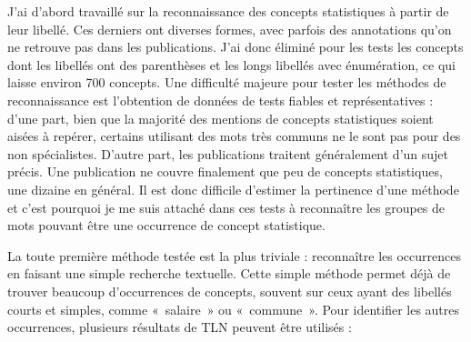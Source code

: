 J'ai d'abord travaillé sur la reconnaissance des concepts statistiques à partir de leur libellé. Ces derniers ont diverses formes, avec parfois des annotations qu'on ne retrouve pas dans les publications. J'ai donc éliminé pour les tests les concepts dont les libellés ont des parenthèses et les longs libellés avec énumération, ce qui laisse environ 700 concepts. Une difficulté majeure pour tester les méthodes de reconnaissance est l'obtention de données de tests fiables et représentatives : d'une part, bien que la majorité des mentions de concepts statistiques soient aisées à repérer, certains utilisant des mots très communs ne le sont pas pour des non spécialistes. D'autre part, les publications traitent généralement d'un sujet précis. Une publication ne couvre finalement que peu de concepts statistiques, une dizaine en général. Il est donc difficile d'estimer la pertinence d'une méthode et c'est pourquoi je me suis attaché dans ces tests à reconnaître les groupes de mots pouvant être une occurrence de concept statistique.
\newline

La toute première méthode testée est la plus triviale : reconnaître les occurrences en faisant une simple recherche textuelle. Cette simple méthode permet déjà de trouver beaucoup d'occurrences de concepts, souvent sur ceux ayant des libellés courts et simples, comme «~salaire~» ou «~commune~». Pour identifier les autres occurrences, plusieurs résultats de TLN peuvent être utilisés :
\newline

